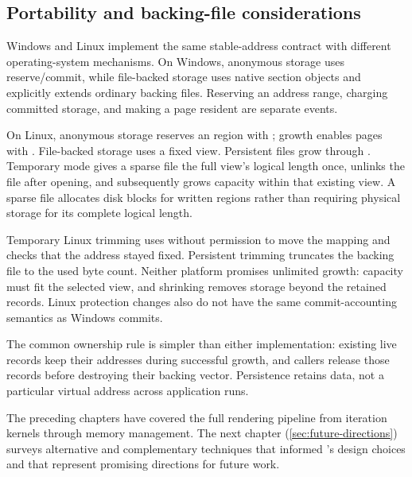 \subsection{Portability and backing-file considerations}
\label{sec:disk_backed_portability_notes}

Windows and Linux implement the same stable-address contract with different
operating-system mechanisms. On Windows, anonymous storage uses
 reserve/commit, while file-backed storage uses native section
objects and explicitly extends ordinary backing files. Reserving an address range,
charging committed storage, and making a page resident are separate events.

On Linux, anonymous storage reserves an  region with
; growth enables pages with . File-backed storage
uses a fixed  view. Persistent files grow through
. Temporary mode gives a sparse file the full view's logical
length once, unlinks the file after opening, and subsequently grows capacity within
that existing view. A sparse file allocates disk blocks for written regions rather
than requiring physical storage for its complete logical length.

Temporary Linux trimming uses  without permission to move the mapping
and checks that the address stayed fixed. Persistent trimming truncates the backing
file to the used byte count. Neither platform promises unlimited growth: capacity
must fit the selected view, and shrinking removes storage beyond the retained
records. Linux protection changes also do not have the same commit-accounting
semantics as Windows commits.

The common ownership rule is simpler than either implementation: existing live
records keep their addresses during successful growth, and callers release those
records before destroying their backing vector. Persistence retains data, not a
particular virtual address across application runs.

The preceding chapters have covered the full rendering pipeline from iteration
kernels through memory management.  The next chapter (\cref{sec:future-directions}) surveys alternative and
complementary techniques that informed \FractalShark{}'s design choices and
that represent promising directions for future work.
